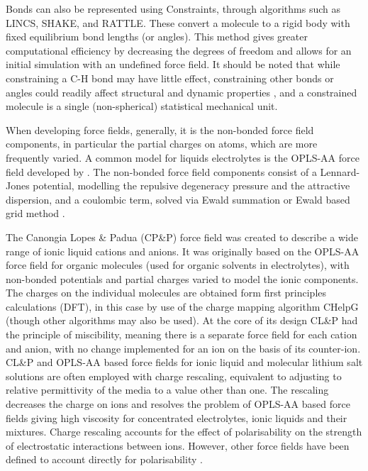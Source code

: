 \documentclass[../main.tex]{subfiles}
\begin{document}
Bonds can also be represented using Constraints, through algorithms such as LINCS\cite{hess_lincs_1997}, SHAKE\cite{ryckaert_numerical_1977}, and RATTLE\cite{andersen_rattle_1983}. These convert a molecule to a rigid body with fixed equilibrium bond lengths (or angles). This method gives greater computational efficiency by decreasing the degrees of freedom and allows for an initial simulation with an undefined force field. It should be noted that while constraining a C-H bond may have little effect, constraining other bonds or angles could readily affect structural and dynamic properties \cite{de_wijn_internal_2011, hess_lincs_1997}, and a constrained molecule is a single (non-spherical) statistical mechanical unit.

When developing force fields, generally, it is the non-bonded force field components, in particular the partial charges on atoms, which are more frequently varied. A common model for liquids electrolytes is the OPLS-AA force field developed by \citeauthor{jorgensen_development_1996} \cite{jorgensen_development_1996}. The non-bonded force field components consist of a Lennard-Jones potential, modelling the repulsive degeneracy pressure and the attractive dispersion, and a coulombic term, solved via Ewald summation \cite{ewald_berechnung_1921} or Ewald based grid method \cite{darden_particle_1993,deserno_how_1998,yeh_ewald_1999}.

The Canongia Lopes \& Padua (CP\&P) force field \cite{canongia_lopes_clp_2012, canongia_lopes_modeling_2004, canongia_lopes_molecular_2004, canongia_lopes_molecular_2006} was created to describe a wide range of ionic liquid cations and anions. It was originally based on the OPLS-AA force field for organic molecules (used for organic solvents in electrolytes), with non-bonded potentials and partial charges varied to model the ionic components. The charges on the individual molecules are obtained form first principles calculations (DFT), in this case by use of the charge mapping algorithm CHelpG\cite{canongia_lopes_clp_2012} (though other algorithms may also be used\cite{spackman_potential_1996,breneman_determining_1990,singh_approach_1984}). At the core of its design CL\&P had the principle of miscibility, meaning there is a separate force field for each cation and anion, with no change implemented for an ion on the basis of its counter-ion. CL\&P and OPLS-AA based force fields for ionic liquid and molecular lithium salt solutions are often employed with charge rescaling, equivalent to adjusting to relative permittivity of the media to a value other than one. The rescaling decreases the charge on ions and resolves the problem of OPLS-AA based force fields giving high viscosity for concentrated electrolytes, ionic liquids and their mixtures\cite{schroder_comparing_2012, schroder_polarizable_2020, shimizu_structural_2015}. Charge rescaling accounts for the effect of polarisability on the strength of electrostatic interactions between ions. However, other force fields have been defined to account directly for polarisability \cite{schroder_polarizable_2020}.
\end{document}
